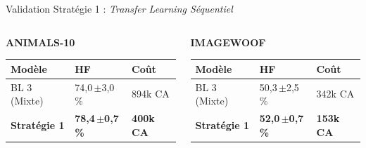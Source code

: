 \documentclass[aspectratio=169, 10pt]{beamer}
\newcommand{\pms}[2]{#1{\tiny\,$\pm$#2}\,\%}
\begin{document}
\begin{frame}{Validation Stratégie 1 : \textit{Transfer Learning Séquentiel}}

  \begin{columns}[T]
    \begin{column}{0.48\textwidth}
      \centering
      \textbf{ANIMALS-10}\\
      \vspace{0.2cm}
      \scriptsize
      \renewcommand{\arraystretch}{1.3}
      \begin{tabular}{@{}lL{1.9cm}C{1.3cm}@{}}
        \toprule
        \color{primary}\textbf{Modèle} & \color{primary}\textbf{HF} & \color{primary}\textbf{Coût} \\
        \midrule
        BL 3 (Mixte)        & \pms{74,0}{3,0} & 894k CA \\
        \textbf{Stratégie 1} & \textbf{\pms{78,4}{0,7}} & \textbf{400k CA} \\
        \bottomrule
      \end{tabular}
    \end{column}
    \begin{column}{0.48\textwidth}
      \centering
      \textbf{IMAGEWOOF}\\
      \vspace{0.2cm}
      \scriptsize
      \renewcommand{\arraystretch}{1.3}
      \begin{tabular}{@{}lL{1.9cm}C{1.3cm}@{}}
        \toprule
        \color{primary}\textbf{Modèle} & \color{primary}\textbf{HF} & \color{primary}\textbf{Coût} \\
        \midrule
        BL 3 (Mixte)        & \pms{50,3}{2,5} & 342k CA \\
        \textbf{Stratégie 1} & \textbf{\pms{52,0}{0,7}} & \textbf{153k CA} \\
        \bottomrule
      \end{tabular}
    \end{column}
  \end{columns}


\end{frame}
\end{document}
